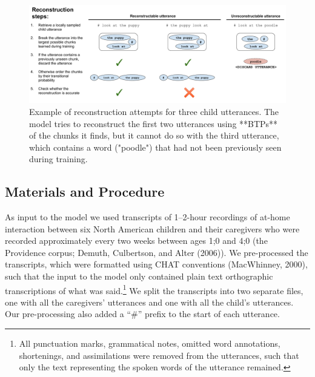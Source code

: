 \documentclass[
  english,
  man,mask,floatsintext]{apa6}
\begin{document}
\begin{figure}
\includegraphics[width=0.99\linewidth]{images/reconstruction_task} \caption{Example of reconstruction attempts for three child utterances. The model tries to reconstruct the first two utterances using **BTPs** of the chunks it finds, but it cannot do so with the third utterance, which contains a word  ("poodle") that had not been previously seen during training.}\label{fig:fig2}
\end{figure}

\hypertarget{materials-and-procedure}{%
\subsection{Materials and Procedure}\label{materials-and-procedure}}

As input to the model we used transcripts of 1--2-hour recordings of at-home interaction between six North American children and their caregivers who were recorded approximately every two weeks between ages 1;0 and 4;0 (the Providence corpus; Demuth, Culbertson, and Alter (2006)). We pre-processed the transcripts, which were formatted using CHAT conventions (MacWhinney, 2000), such that the input to the model only contained plain text orthographic transcriptions of what was said.\footnote{All punctuation marks, grammatical notes, omitted word annotations, shortenings, and assimilations were removed from the utterances, such that only the text representing the spoken words of the utterance remained.} We split the transcripts into two separate files, one with all the caregivers' utterances and one with all the child's utterances. Our pre-processing also added a \enquote{\#} prefix to the start of each utterance.
\end{document}
